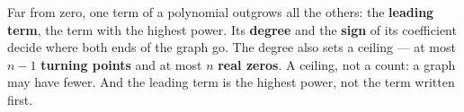 \documentclass[10pt]{article}
\begin{document}
\vspace{0.14in}

\begin{remindbox}
\small
Far from zero, one term of a polynomial outgrows all the others: the \textbf{leading term},
the term with the highest power. Its \textbf{degree} and the \textbf{sign} of its coefficient
decide where both ends of the graph go. The degree also sets a ceiling --- at most $n - 1$
\textbf{turning points} and at most $n$ \textbf{real zeros}. A ceiling, not a count: a graph
may have fewer. And the leading term is the highest power, not the term written first.
\end{remindbox}
\end{document}
